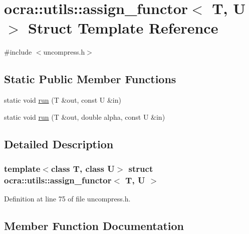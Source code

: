 \hypertarget{structocra_1_1utils_1_1assign__functor}{}\section{ocra\+:\+:utils\+:\+:assign\+\_\+functor$<$ T, U $>$ Struct Template Reference}
\label{structocra_1_1utils_1_1assign__functor}


{\ttfamily \#include $<$uncompress.\+h$>$}

\subsection*{Static Public Member Functions}
\begin{DoxyCompactItemize}
\item 
static void \hyperlink{structocra_1_1utils_1_1assign__functor_a7062b68b69083283a00cdcf05331b5f0}{run} (T \&out, const U \&in)
\item 
static void \hyperlink{structocra_1_1utils_1_1assign__functor_a1fbc5042510c940d2968b51a9035cd75}{run} (T \&out, double alpha, const U \&in)
\end{DoxyCompactItemize}


\subsection{Detailed Description}
\subsubsection*{template$<$class T, class U$>$\newline
struct ocra\+::utils\+::assign\+\_\+functor$<$ T, U $>$}



Definition at line 75 of file uncompress.\+h.



\subsection{Member Function Documentation}
\hypertarget{structocra_1_1utils_1_1assign__functor_a7062b68b69083283a00cdcf05331b5f0}{}\label{structocra_1_1utils_1_1assign__functor_a7062b68b69083283a00cdcf05331b5f0} 
